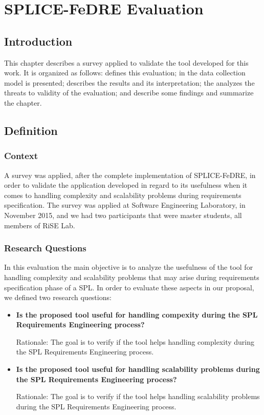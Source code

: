 \chapter{SPLICE-FeDRE Evaluation}
\label{ch:caseStudy}

\section{Introduction}
\label{sc:experimentIntroduction}

This chapter describes a survey applied to validate the tool developed for this
work. It is organized as follows:  defines this evaluation; in  the 
data collection model is presented;  describes the results and its interpretation; the 
 analyzes the threats to validity of the evaluation;  and  describe some 
findings and summarize the chapter.

\section{Definition}
\label{sc:definition}

\subsection{Context}
A survey was applied, after the complete implementation of SPLICE-FeDRE, in
order to validate the application developed in regard to its usefulness when it 
comes to handling complexity and scalability problems during requirements specification. 
The survey was applied at Software Engineering Laboratory, in November 2015, and we had 
two participants that were master students, all members of \acf{RiSE} Lab.
\subsection{Research Questions}

In this evaluation the main objective is to analyze the usefulness of the tool for handling 
complexity and scalability problems that may arise during requirements specification phase 
of a \acf{SPL}. In order to evaluate these aspects in our proposal, we 
defined two research questions:
\begin{itemize}
\item \textbf{Is the proposed tool useful for handling compexity during the SPL Requirements Engineering process?}

Rationale: The goal is to verify if the tool helps handling complexity during the \ac{SPL} 
Requirements Engineering process.
\item \textbf{Is the proposed tool useful for handling scalability problems during the SPL Requirements Engineering process?}

Rationale: The goal is to verify if the tool helps handling scalability problems during the \ac{SPL} 
Requirements Engineering process.

\end{itemize}


